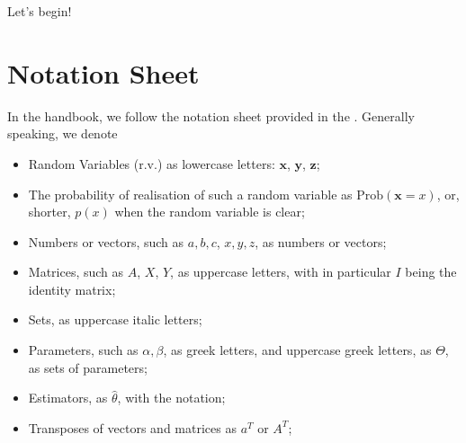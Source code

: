 \documentclass[letterpaper,10pt,english]{jupyterBook}
\begin{document}
\sphinxAtStartPar
{}

\sphinxAtStartPar
Let’s begin!

\sphinxstepscope


\chapter{Notation Sheet}
\label{\detokenize{notation:notation-sheet}}\label{\detokenize{notation::doc}}
\sphinxAtStartPar
In the handbook, we follow the notation sheet provided in the . Generally speaking, we denote
\begin{itemize}
\item {} 
\sphinxAtStartPar
Random Variables (r.v.) as  lowercase letters: \(\mathbf x\), \(\mathbf y\), \(\mathbf z\);

\item {} 
\sphinxAtStartPar
The probability of realisation of such a random variable as \(\text{Prob}(\mathbf x=x)\), or, shorter, \(p(x)\) when the random variable is clear;

\item {} 
\sphinxAtStartPar
Numbers or vectors, such as \(a, b, c\), \(x, y, z\), as numbers or vectors;

\item {} 
\sphinxAtStartPar
Matrices, such as \(A\), \(X\), \(Y\), as uppercase letters, with in particular \(I\) being the identity matrix;

\item {} 
\sphinxAtStartPar
Sets, as uppercase italic letters;

\item {} 
\sphinxAtStartPar
Parameters, such as \(\alpha, \beta\), as greek letters, and uppercase greek letters, as \(\Theta\), as sets of parameters;

\item {} 
\sphinxAtStartPar
Estimators, as \(\hat{\theta}\), with the  notation;

\item {} 
\sphinxAtStartPar
Transposes of vectors and matrices as \(a^T\) or \(A^T\);

\end{itemize}
\end{document}
